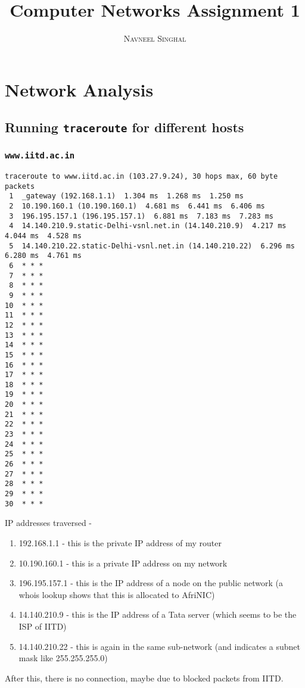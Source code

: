 \documentclass[a4paper]{article}
\title{\textbf{Computer Networks Assignment 1}}
\author{\textsc{Navneel Singhal}}
\begin{document}
\maketitle
\tableofcontents

\section{Network Analysis}

\subsection{Running \texttt{traceroute} for different hosts}

\subsubsection{\texttt{www.iitd.ac.in}}
\begin{lstlisting}
traceroute to www.iitd.ac.in (103.27.9.24), 30 hops max, 60 byte packets
 1  _gateway (192.168.1.1)  1.304 ms  1.268 ms  1.250 ms
 2  10.190.160.1 (10.190.160.1)  4.681 ms  6.441 ms  6.406 ms
 3  196.195.157.1 (196.195.157.1)  6.881 ms  7.183 ms  7.283 ms
 4  14.140.210.9.static-Delhi-vsnl.net.in (14.140.210.9)  4.217 ms  4.044 ms  4.528 ms
 5  14.140.210.22.static-Delhi-vsnl.net.in (14.140.210.22)  6.296 ms  6.280 ms  4.761 ms
 6  * * *
 7  * * *
 8  * * *
 9  * * *
10  * * *
11  * * *
12  * * *
13  * * *
14  * * *
15  * * *
16  * * *
17  * * *
18  * * *
19  * * *
20  * * *
21  * * *
22  * * *
23  * * *
24  * * *
25  * * *
26  * * *
27  * * *
28  * * *
29  * * *
30  * * *
\end{lstlisting}

IP addresses traversed - 
\begin{enumerate}
\item 192.168.1.1 - this is the private IP address of my router
\item 10.190.160.1 - this is a private IP address on my network
\item 196.195.157.1 - this is the IP address of a node on the public network (a whois lookup shows that this is allocated to AfriNIC)
\item 14.140.210.9 - this is the IP address of a Tata server (which seems to be the ISP of IITD)
\item 14.140.210.22 - this is again in the same sub-network (and indicates a subnet mask like 255.255.255.0)
\end{enumerate}
After this, there is no connection, maybe due to blocked packets from IITD.
\end{document}
